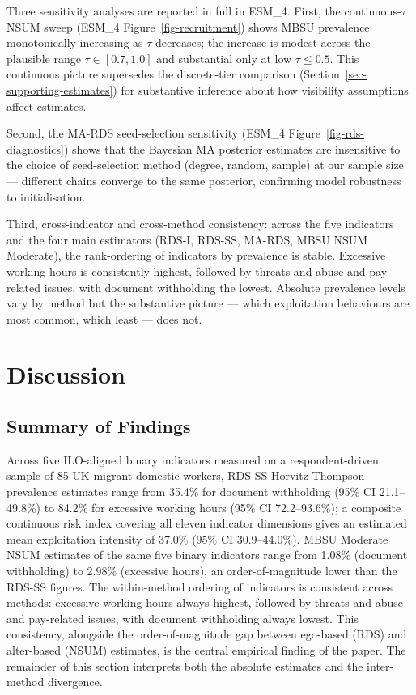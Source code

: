 \documentclass[
  12pt,
  letterpaper,
  DIV=11,
  numbers=noendperiod]{scrartcl}
\begin{document}
Three sensitivity analyses are reported in full in ESM\_4. First, the
continuous-\(\tau\) NSUM sweep (ESM\_4 Figure~\ref{fig-recruitment})
shows MBSU prevalence monotonically increasing as \(\tau\) decreases;
the increase is modest across the plausible range
\(\tau \in [0.7, 1.0]\) and substantial only at low \(\tau \le 0.5\).
This continuous picture supersedes the discrete-tier comparison
(Section~\ref{sec-supporting-estimates}) for substantive inference about
how visibility assumptions affect estimates.

Second, the MA-RDS seed-selection sensitivity (ESM\_4
Figure~\ref{fig-rds-diagnostics}) shows that the Bayesian MA posterior
estimates are insensitive to the choice of seed-selection method
(degree, random, sample) at our sample size --- different chains
converge to the same posterior, confirming model robustness to
initialisation.

Third, cross-indicator and cross-method consistency: across the five
indicators and the four main estimators (RDS-I, RDS-SS, MA-RDS, MBSU
NSUM Moderate), the rank-ordering of indicators by prevalence is stable.
Excessive working hours is consistently highest, followed by threats and
abuse and pay-related issues, with document withholding the lowest.
Absolute prevalence levels vary by method but the substantive picture
--- which exploitation behaviours are most common, which least --- does
not.

\section{Discussion}\label{sec-discussion}

\subsection{Summary of Findings}\label{sec-summary}

Across five ILO-aligned binary indicators measured on a
respondent-driven sample of 85 UK migrant domestic workers, RDS-SS
Horvitz-Thompson prevalence estimates range from 35.4\% for document
withholding (95\% CI 21.1--49.8\%) to 84.2\% for excessive working hours
(95\% CI 72.2--93.6\%); a composite continuous risk index covering all
eleven indicator dimensions gives an estimated mean exploitation
intensity of 37.0\% (95\% CI 30.9--44.0\%). MBSU Moderate NSUM estimates
of the same five binary indicators range from 1.08\% (document
withholding) to 2.98\% (excessive hours), an order-of-magnitude lower
than the RDS-SS figures. The within-method ordering of indicators is
consistent across methods: excessive working hours always highest,
followed by threats and abuse and pay-related issues, with document
withholding always lowest. This consistency, alongside the
order-of-magnitude gap between ego-based (RDS) and alter-based (NSUM)
estimates, is the central empirical finding of the paper. The remainder
of this section interprets both the absolute estimates and the
inter-method divergence.
\end{document}
